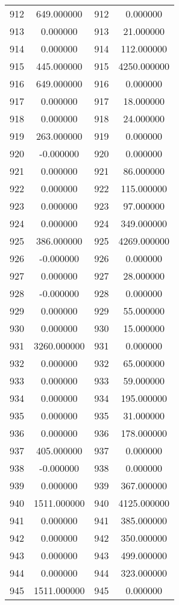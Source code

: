 \documentclass[12pt]{article}
\begin{document}
\begin{longtable}{@{}cccc@{}}
912 & 649.000000 & 912 & 0.000000 \\
913 & 0.000000 & 913 & 21.000000 \\
914 & 0.000000 & 914 & 112.000000 \\
915 & 445.000000 & 915 & 4250.000000 \\
916 & 649.000000 & 916 & 0.000000 \\
917 & 0.000000 & 917 & 18.000000 \\
918 & 0.000000 & 918 & 24.000000 \\
919 & 263.000000 & 919 & 0.000000 \\
920 & -0.000000 & 920 & 0.000000 \\
921 & 0.000000 & 921 & 86.000000 \\
922 & 0.000000 & 922 & 115.000000 \\
923 & 0.000000 & 923 & 97.000000 \\
924 & 0.000000 & 924 & 349.000000 \\
925 & 386.000000 & 925 & 4269.000000 \\
926 & -0.000000 & 926 & 0.000000 \\
927 & 0.000000 & 927 & 28.000000 \\
928 & -0.000000 & 928 & 0.000000 \\
929 & 0.000000 & 929 & 55.000000 \\
930 & 0.000000 & 930 & 15.000000 \\
931 & 3260.000000 & 931 & 0.000000 \\
932 & 0.000000 & 932 & 65.000000 \\
933 & 0.000000 & 933 & 59.000000 \\
934 & 0.000000 & 934 & 195.000000 \\
935 & 0.000000 & 935 & 31.000000 \\
936 & 0.000000 & 936 & 178.000000 \\
937 & 405.000000 & 937 & 0.000000 \\
938 & -0.000000 & 938 & 0.000000 \\
939 & 0.000000 & 939 & 367.000000 \\
940 & 1511.000000 & 940 & 4125.000000 \\
941 & 0.000000 & 941 & 385.000000 \\
942 & 0.000000 & 942 & 350.000000 \\
943 & 0.000000 & 943 & 499.000000 \\
944 & 0.000000 & 944 & 323.000000 \\
945 & 1511.000000 & 945 & 0.000000 \\

\end{longtable}
\end{document}
